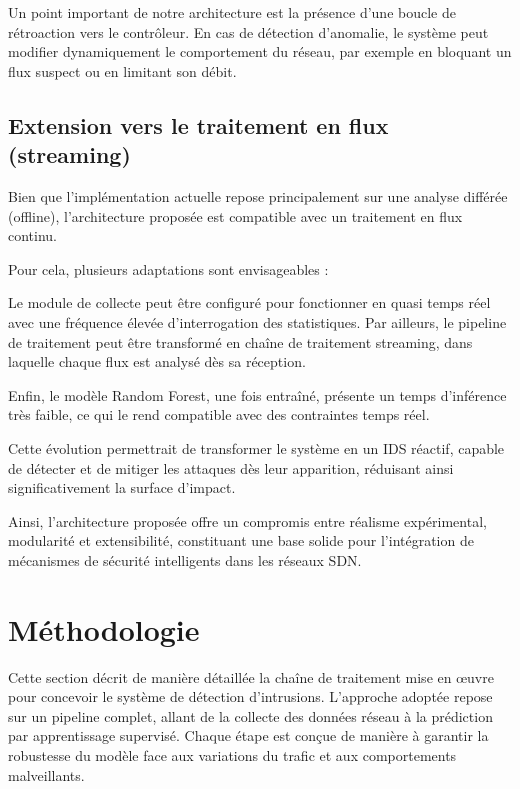 \documentclass[11pt]{article}
\begin{document}
Un point important de notre architecture est la présence d’une boucle de rétroaction vers le contrôleur. En cas de détection d’anomalie, le système peut modifier dynamiquement le comportement du réseau, par exemple en bloquant un flux suspect ou en limitant son débit.

\subsection{Extension vers le traitement en flux (streaming)}

Bien que l’implémentation actuelle repose principalement sur une analyse différée (offline), l’architecture proposée est compatible avec un traitement en flux continu.

Pour cela, plusieurs adaptations sont envisageables :

Le module de collecte peut être configuré pour fonctionner en quasi temps réel avec une fréquence élevée d’interrogation des statistiques. Par ailleurs, le pipeline de traitement peut être transformé en chaîne de traitement streaming, dans laquelle chaque flux est analysé dès sa réception.

Enfin, le modèle Random Forest, une fois entraîné, présente un temps d’inférence très faible, ce qui le rend compatible avec des contraintes temps réel.

Cette évolution permettrait de transformer le système en un IDS réactif, capable de détecter et de mitiger les attaques dès leur apparition, réduisant ainsi significativement la surface d’impact.

\medskip

Ainsi, l’architecture proposée offre un compromis entre réalisme expérimental, modularité et extensibilité, constituant une base solide pour l’intégration de mécanismes de sécurité intelligents dans les réseaux SDN.




\section{Méthodologie}\label{sec:methodology}

Cette section décrit de manière détaillée la chaîne de traitement mise en œuvre pour concevoir le système de détection d’intrusions. L’approche adoptée repose sur un pipeline complet, allant de la collecte des données réseau à la prédiction par apprentissage supervisé. Chaque étape est conçue de manière à garantir la robustesse du modèle face aux variations du trafic et aux comportements malveillants.
\end{document}
